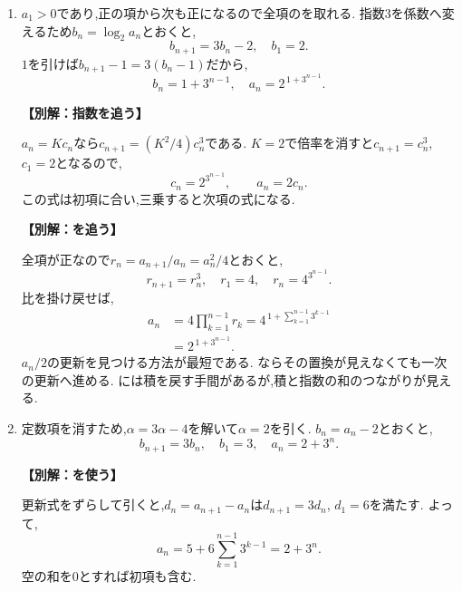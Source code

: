 \begin{enumerate}[label=\textbf{問\arabic*.},leftmargin=3.8em,format=\bookitemlink{practice-basic}{solution}{problem}]
          \item $a_1>0$であり,正の項から次も正になるので全項のを取れる.
                  指数$3$を係数へ変えるため$b_n=\log_2a_n$とおくと,
                  \[
                    b_{n+1}=3b_n-2,\quad b_1=2.
                  \]
                  $1$を引けば$b_{n+1}-1=3(b_n-1)$だから,
                  \[
                    b_n=1+3^{n-1},\quad a_n=2^{\,1+3^{n-1}}.
                  \]
                  \par\smallskip\noindent\textbf{【別解：指数を追う】}\par
                  $a_n=Kc_n$なら$c_{n+1}=(K^2/4)c_n^3$である.
                  $K=2$で倍率を消すと$c_{n+1}=c_n^3$, $c_1=2$となるので,
                  \[
                    c_n=2^{3^{n-1}},\qquad a_n=2c_n.
                  \]
                  この式は初項に合い,三乗すると次項の式になる.
                  \par\smallskip\noindent\textbf{【別解：を追う】}\par
                  全項が正なので$r_n=a_{n+1}/a_n=a_n^2/4$とおくと,
                  \[
                    r_{n+1}=r_n^3,\quad r_1=4,\quad r_n=4^{3^{n-1}}.
                  \]
                  比を掛け戻せば,
                  \[
                  \begin{aligned}
                    a_n&=4\prod_{k=1}^{n-1}r_k
                       =4^{\,1+\sum_{k=1}^{n-1}3^{k-1}}\\
                       &=2^{\,1+3^{n-1}}.
                  \end{aligned}
                  \]
                  $a_n/2$の更新を見つける方法が最短である.
                  ならその置換が見えなくても一次の更新へ進める.
                  には積を戻す手間があるが,積と指数の和のつながりが見える.

          \item 定数項を消すため,$\alpha=3\alpha-4$を解いて$\alpha=2$を引く.
                  $b_n=a_n-2$とおくと,
                  \[
                    b_{n+1}=3b_n,\quad b_1=3,\quad a_n=2+3^n.
                  \]
                  \par\smallskip\noindent\textbf{【別解：を使う】}\par
                  更新式をずらして引くと,$d_n=a_{n+1}-a_n$は$d_{n+1}=3d_n$, $d_1=6$を満たす.
                  よって,
                  \[
                    a_n=5+6\sum_{k=1}^{n-1}3^{k-1}=2+3^n.
                  \]
                  空の和を$0$とすれば初項も含む.


\end{enumerate}

